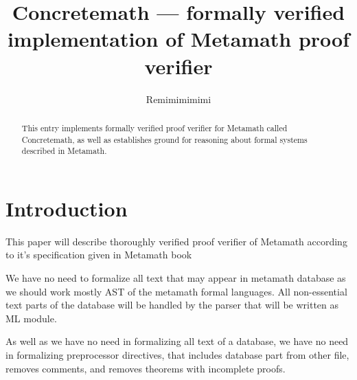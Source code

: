 \documentclass[11pt,a4paper]{article}
\begin{document}
\title{Concretemath --- formally verified implementation of Metamath proof verifier}
\author{Remimimimimi}
\maketitle

\begin{abstract}
  This entry implements formally verified proof verifier for Metamath called
  Concretemath, as well as establishes ground for reasoning about formal systems
  described in Metamath.
\end{abstract}

\tableofcontents

\section{Introduction}

This paper will describe thoroughly verified proof verifier of Metamath according to it's specification given in Metamath book \cite{metamath}


We have no need to formalize all text that may appear in metamath database as we
should work mostly AST of the metamath formal languages. All non-essential text
parts of the database will be handled by the parser that will be written as ML
module.

As well as we have no need in formalizing all text of a database, we have no
need in formalizing preprocessor directives, that includes database part from
other file, removes comments, and removes theorems with incomplete proofs.





\end{document}
